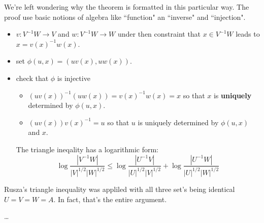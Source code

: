 \documentclass[12pt]{article}
\begin{document}
{We're left wondering why the theorem is formatted in this particular way.  The proof use basic notions of algebra like ``function" an  ``inverse" and ``injection".
\begin{itemize}
\item $v : V^{-1} W \to V$ and $w : V^{-1} W \to W$ under then constraint 
that $x \in V^{-1}W$ leads to $x = v(x)^{-1} w(x)$.  
\item set $\phi(u,x) = (uv(x), uw(x))$.
\item check that $\phi$ is injective
\begin{itemize}
\item $(uv(x))^{-1} (uw(x)) = v(x)^{-1} w(x) = x $ so that $x$ is {\color{red}\textbf{uniquely}} determined by $\phi(u,x)$.  
\item $(uv(x)) v(x)^{-1} = u $ so that $u$ is uniquely determined by $\phi(u,x)$ and $x$.
\end{itemize}
The triangle ineqality has a logarithmic form:
$$ \log \frac{|V^{-1}W|}{|V|^{1/2}|W|^{1/2}} 
\leq \log \frac{|U^{-1}V|}{|U|^{1/2}|V|^{1/2}} + \log \frac{|U^{-1}W|}{|U|^{1/2}|W|^{1/2}}$$
\end{itemize}
Rusza's triangle inequality was appliled with all three set's being identical $U = V = W = A$.  In fact, that's the entire argument.

\vfill

\begin{thebibliography}{}

\item \dots 

\end{thebibliography}
}
\end{document}
